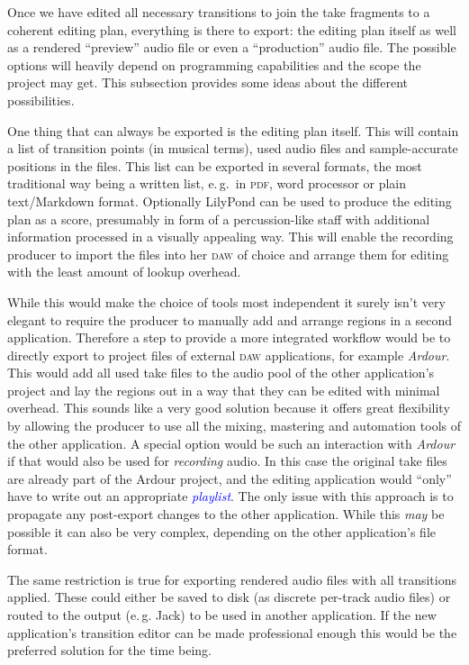 \documentclass[11pt,a4paper]{article}
\newcommand*{\term}[1]{\textcolor{blue}{\emph{#1}}}
\begin{document}
Once we have edited all necessary transitions to join the take fragments to a
coherent editing plan, everything is there to export: the editing plan itself as well
as a rendered “preview” audio file or even a “production” audio file.
The possible options will heavily depend on programming capabilities and the scope
the project may get. This subsection provides some ideas about the different
possibilities.

One thing that can always be exported is the editing plan itself. This will contain
a list of transition points (in musical terms), used audio files and sample-accurate
positions in the files.
This list can be exported in several formats, the most traditional way being a written
list, e.\,g.\ in \textsc{pdf}, word processor or plain text/Markdown format.
Optionally LilyPond can be used to produce the editing plan as a score,
presumably in form of a percussion-like staff with additional information
processed in a visually appealing way.
This will enable the recording producer to import the files into her \textsc{daw} of
choice and arrange them for editing with the least amount of lookup overhead.

While this would make the choice of tools most independent it surely isn't very
elegant to require the producer to manually add and arrange regions in a second
application. Therefore a step to provide a more integrated workflow would be to
directly export to project files of external \textsc{daw} applications, for example
\emph{Ardour}. This would add all used take files to the audio pool of the other
application's project and lay the regions out in a way that they can be edited
with minimal overhead. This sounds like a very good solution because it offers
great flexibility by allowing the producer to use all the mixing, mastering and
automation tools of the other application. 
A special option would be such an interaction with \emph{Ardour} if that would also
be used for \emph{recording} audio. In this case the original take files are
already part of the Ardour project, and the editing application would “only” have
to write out an appropriate \term{playlist}.
The only issue with this approach is to propagate any post-export changes to the
other application. While this \emph{may} be possible it can also be very complex,
depending on the other application's file format.

The same restriction is true for exporting rendered audio files with all transitions
applied. These could either be saved to disk (as discrete per-track audio files) or
routed to the output (e.\,g. Jack) to be used in another application. If the new
application's transition editor can be made professional enough this would be
the preferred solution for the time being.
\end{document}
